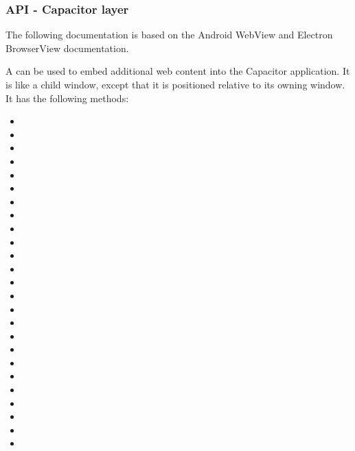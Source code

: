 \subsubsection{API - Capacitor layer}
\label{sec:Capacitor-BrowserView:API_CapacitorLayer}

\begin{note}[Note]
  The following documentation is based on the Android WebView and Electron BrowserView documentation.
  \cite{android:api, electron:docs}
\end{note}

A  can be used to embed additional web content into the Capacitor application.
It is like a child window, except that it is positioned relative to its owning window.
It has the following methods:

\begin{multicols}{2}
  \begin{itemize}
    \setlength\itemsep{-0.8em}
    \item {}
    \item {}
    \item {}
    \item {}
    \item {}
    \item {}
    \item {}
    \item {}
    \item {}
    \item {}
    \item {}
    \item {}
    \item {}
    \item {}
    \item {}
    \item {}
    \item {}
    \item {}
    \item {}
    \item {}
    \item {}
    \item {}
    \item {}
    \item {}
    \item {}
    \end{itemize}
\end{multicols}

